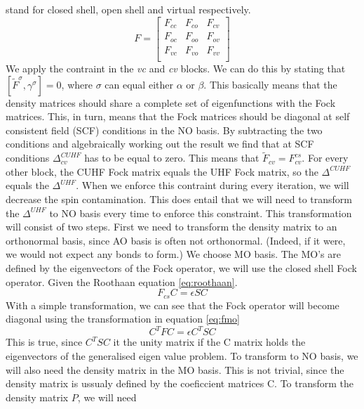 \documentclass[twoside,twocolumn,9pt]{article}
\begin{document}
stand for closed shell, open shell and virtual respectively.
\begin{equation}\label{eq:fockblock}
  F = \begin{bmatrix}
    F_{cc} & F_{co} & F_{cv} \\
    F_{oc} & F_{oo} & F_{ov} \\
    F_{vc} & F_{vo} & F_{vv} \\
  \end{bmatrix}
\end{equation}
We apply the contraint in the \textit{vc} and \textit{cv} blocks. We can do this by stating that $[\tilde{F}^\sigma, \gamma^\sigma] = 0$, where $\sigma$ can equal either $\alpha$ 
or $\beta$. This basically means that the density matrices should share a complete set of eigenfunctions with the Fock matrices. This, in turn, means that the Fock matrices should be 
diagonal at self consistent field (SCF) conditions in the NO basis. By subtracting the two conditions and algebraically working out the result we find that at SCF conditions 
$\Delta^{CUHF}_{cv}$ has to be equal to zero. This means that $\tilde{F}_{cv} = F_{cv}^{cs}$\cite{Scuseria2010}. For every other block, the CUHF Fock matrix equals the UHF Fock matrix,
so the $\Delta^{CUHF}$ equals the $\Delta^{UHF}$. When we enforce this contraint during every iteration, we will decrease the spin contamination. This does entail that we will need 
to transform the $\Delta^{UHF}$ to NO basis every time to enforce this constraint. This transformation will consist of two steps. First we need to transform the density matrix to 
an orthonormal basis, since AO basis is often not orthonormal. (Indeed, if it were, we would not expect any bonds to form.) We choose MO basis. The MO's are defined by the 
eigenvectors of the Fock operator, we will use the closed shell Fock operator. Given the Roothaan equation \eqref{eq:roothaan}.
\begin{equation}\label{eq:roothaan}
  F_{cs}C = \epsilon S C
\end{equation}
With a simple transformation, we can see that the Fock operator will become diagonal using the transformation in equation \eqref{eq:fmo}
\begin{equation}\label{eq:fmo}
  C^T F C = \epsilon C^T S C
\end{equation}
This is true, since $C^T S C$ it the unity matrix if the C matrix holds the eigenvectors of the generalised eigen value problem. To transform to NO basis, we will also need the
density matrix in the MO basis. This is not trivial, since the density matrix is ussualy defined by the coeficcient matrices C. To transform the density matrix $P$, we will need
\end{document}
